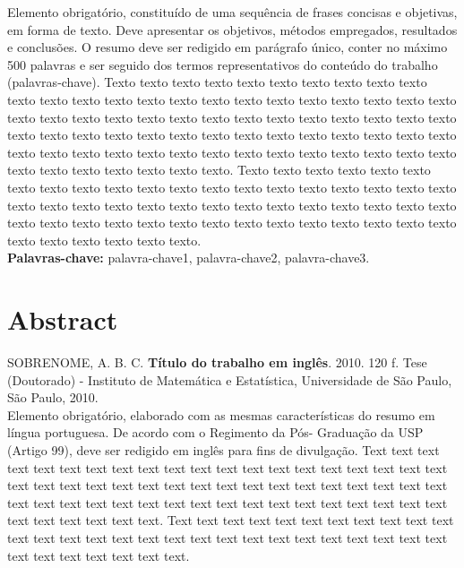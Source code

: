 \documentclass[11pt,twoside,a4paper]{book}
\theoremstyle{plain}
\theoremstyle{definition}
\begin{document}
Elemento obrigatório, constituído de uma sequência de frases concisas e
objetivas, em forma de texto.  Deve apresentar os objetivos, métodos empregados,
resultados e conclusões.  O resumo deve ser redigido em parágrafo único, conter
no máximo 500 palavras e ser seguido dos termos representativos do conteúdo do
trabalho (palavras-chave). 
Texto texto texto texto texto texto texto texto texto texto texto texto texto
texto texto texto texto texto texto texto texto texto texto texto texto texto
texto texto texto texto texto texto texto texto texto texto texto texto texto
texto texto texto texto texto texto texto texto texto texto texto texto texto
texto texto texto texto texto texto texto texto texto texto texto texto texto
texto texto texto texto texto texto texto texto.
Texto texto texto texto texto texto texto texto texto texto texto texto texto
texto texto texto texto texto texto texto texto texto texto texto texto texto
texto texto texto texto texto texto texto texto texto texto texto texto texto
texto texto texto texto texto texto texto texto texto texto texto texto texto
texto texto.
\\

\noindent \textbf{Palavras-chave:} palavra-chave1, palavra-chave2, palavra-chave3.

\chapter*{Abstract}
\noindent SOBRENOME, A. B. C. \textbf{Título do trabalho em inglês}. 
2010. 120 f.
Tese (Doutorado) - Instituto de Matemática e Estatística,
Universidade de São Paulo, São Paulo, 2010.
\\


Elemento obrigatório, elaborado com as mesmas características do resumo em
língua portuguesa. De acordo com o Regimento da Pós- Graduação da USP (Artigo
99), deve ser redigido em inglês para fins de divulgação. 
Text text text text text text text text text text text text text text text text
text text text text text text text text text text text text text text text text
text text text text text text text text text text text text text text text text
text text text text text text text text text text text text.
Text text text text text text text text text text text text text text text text
text text text text text text text text text text text text text text text text
text text text.
\\
\end{document}
